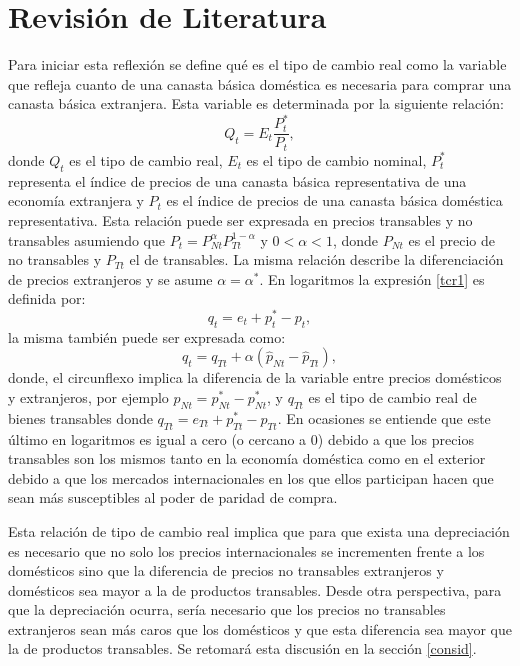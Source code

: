 \documentclass[12pt,letterpaper]{article}
\begin{document}
\section{Revisión de Literatura}\label{pre}


Para iniciar esta reflexión se define qué es el tipo de cambio real como la variable que refleja cuanto de una canasta básica doméstica es necesaria para comprar una canasta básica extranjera. Esta variable es determinada por la siguiente relación:
\begin{equation}\label{tcr1}
Q_t=E_t\frac{P_t^*}{P_t},
\end{equation}
donde $Q_t$ es el tipo de cambio real, $E_t$ es el tipo de cambio nominal, $P_t^*$ representa el índice de precios de una canasta básica representativa de una economía extranjera y $P_t$ es el índice de precios de una canasta básica doméstica representativa. Esta relación puede ser expresada en precios transables y no transables asumiendo que $P_t=P_{Nt}^{\alpha} P_{Tt}^{1-\alpha}$ y $0<\alpha<1$, donde $P_{Nt}$ es el precio de no transables y $P_{Tt}$ el de transables. La misma relación describe la diferenciación de precios extranjeros y se asume $\alpha=\alpha^*$. En logaritmos la expresión \ref{tcr1} es definida por:
\begin{equation}\label{tcrlog}
q_t=e_t+p_t^*-p_t,
\end{equation}
la misma también puede ser expresada como:
\begin{equation}\label{tcr2}
q_t=q_{Tt}+\alpha(\hat{p}_{Nt}-\hat{p}_{Tt}),
\end{equation}
donde, el circunflexo implica la diferencia de la variable entre precios domésticos y extranjeros, por ejemplo $\hat{p}_{Nt}=p_{Nt}^*-p_{Nt}^*$, y $q_{Tt}$ es el tipo de cambio real de bienes transables donde $q_{Tt}=e_{Tt}+p_{Tt}^*-p_{Tt}$. En ocasiones se entiende que este último en logaritmos es igual a cero (o cercano a 0) debido a que los precios transables son los mismos tanto en la economía doméstica como en el exterior debido a que los mercados internacionales en los que ellos participan hacen que sean más susceptibles al poder de paridad de compra. 

Esta relación de tipo de cambio real implica que para que exista una depreciación es necesario que no solo los precios internacionales se incrementen frente a los domésticos sino que la diferencia de precios no transables extranjeros y domésticos sea mayor a la de productos transables. Desde otra perspectiva, para que la depreciación ocurra, sería necesario que los precios no transables extranjeros sean más caros que los domésticos y que esta diferencia sea mayor que la de productos transables. Se retomará esta discusión en la sección \ref{consid}.
\end{document}
